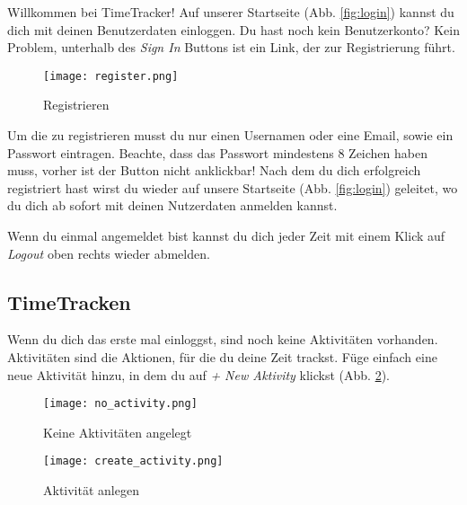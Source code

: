 Willkommen bei TimeTracker! Auf unserer Startseite (Abb. \ref{fig:login}) kannst du dich mit deinen Benutzerdaten einloggen.  
Du hast noch kein Benutzerkonto? Kein Problem, unterhalb des \textit{Sign In} Buttons ist ein Link, der zur Registrierung führt.
 

\begin{figure}[H]
	\hspace{-1.5cm}
	\centering
	\texttt{[image: register.png]}
	\caption{Registrieren}
	\label{fig:register}
\end{figure}

Um die zu registrieren musst du nur einen Usernamen oder eine Email, sowie ein Passwort eintragen. Beachte, dass das Passwort mindestens 8 Zeichen haben muss, vorher ist der Button nicht anklickbar! 
Nach dem du dich erfolgreich registriert hast wirst du wieder auf unsere Startseite (Abb. \ref{fig:login}) geleitet, wo du dich ab sofort mit deinen Nutzerdaten anmelden kannst. 

Wenn du einmal angemeldet bist kannst du dich jeder Zeit mit einem Klick auf \textit{Logout} oben rechts wieder abmelden.

\subsection{TimeTracken}

Wenn du dich das erste mal einloggst, sind noch keine Aktivitäten vorhanden. 
Aktivitäten sind die Aktionen, für die du deine Zeit trackst. 
Füge einfach eine neue Aktivität hinzu, in dem du auf \textit{+ New Aktivity} klickst (Abb. \ref{fig:no_activity}). 

\begin{figure}[H]
	\hspace{-1.5cm}
	\centering
	\texttt{[image: no\_activity.png]}
	\caption{Keine Aktivitäten angelegt}
	\label{fig:no_activity}
\end{figure}

\begin{figure}[H]
	\hspace{-1.5cm}
	\centering
	\texttt{[image: create\_activity.png]}
	\caption{Aktivität anlegen}
	\label{fig:create_activity}
\end{figure}

